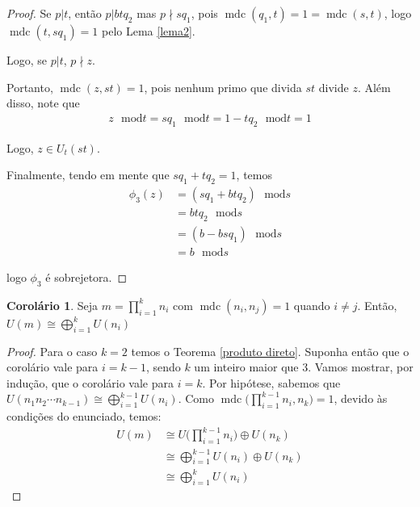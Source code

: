 \documentclass[a4paper,portuguese,11pt,twoside, leqno]{book}
\DeclareMathOperator{\mdc}{mdc}
\theoremstyle{definition}
\newtheorem{corollary}{Corolário}[theorem]
\begin{document}
\begin{proof}
		\par\vspace{0.3cm} Se $p|t$, então $p|btq_2$ mas $p\nmid sq_1$, pois $\mdc(q_1, t) = 1 = \mdc(s,t)$, logo $\mdc(t, sq_1) = 1$ pelo Lema \eqref{lema2}.
		\par\vspace{0.3cm} Logo, se $p|t$, $p\nmid z$.
		\par\vspace{0.3cm} Portanto, $\mdc(z, st) = 1$, pois nenhum primo que divida $st$ divide $z$. Além disso, note que 
		\begin{align*}
		z\text{ }\mathrm{mod} t = sq_1\text{ }\mathrm{mod} t = 1 - tq_2 \text{ }\mathrm{mod} t = 1
		\end{align*} 
		\par\vspace{0.3cm} Logo, $z\in U_t(st)$. 
		\par\vspace{0.3cm} Finalmente, tendo em mente que $sq_1 + tq_2 = 1$, temos
		\begin{align*}
		\phi_3(z) &= (sq_1 + btq_2)\text{ }\mathrm{mod} s \\ &= btq_2\text{ }\mathrm{mod} s \\ &= (b - bsq_1)\text{ }\mathrm{mod} s \\ &= b\text{ }\mathrm{mod} s
		\end{align*}
		\par\vspace{0.3cm}logo $\phi_3$ é sobrejetora.
		
	\end{proof}
	
	
	\begin{corollary}
		\label{produto direto de U(m)}
		Seja $\displaystyle{m = \prod_{i = 1}^{k}n_i}$ com $\mdc(n_i, n_j) = 1$ quando $i\neq j$. Então, 
		$\displaystyle{U(m)\cong\bigoplus_{i = 1}^{k} U(n_i)}$
	\end{corollary}
	
	\begin{proof}
		Para o caso $k = 2$ temos o Teorema \eqref{produto direto}. Suponha então que o corolário vale para $i = k-1$, sendo $k$ um inteiro maior que 3. Vamos mostrar, por indução, que o corolário vale para $i = k$.	Por hipótese, sabemos que $U(n_1n_2\cdots n_{k-1})\cong \displaystyle{\bigoplus_{i=1}^{k-1}U(n_i)}$. Como $\mdc \Bigg(\displaystyle{ \prod_{i=1}^{k-1}n_i }, n_k\Bigg) = 1$, devido às condições do enunciado, temos:
		\begin{align*}
		U(m) &\cong U\Bigg(\displaystyle{\prod_{i=1}^{k-1}n_i}\Bigg)\oplus U(n_k) \\
		&\cong \bigoplus_{i=1}^{k-1}U(n_i)\oplus U(n_k) \\
		&\cong \bigoplus_{i=1}^{k}U(n_i)
		\end{align*}
		
	\end{proof}
	
\end{document}
